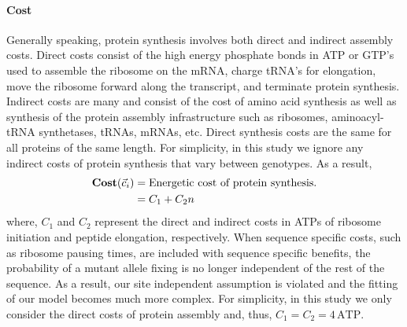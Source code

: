 \documentclass{article}
\newcommand{\cvec}{\ensuremath{\Vec{c}}\xspace}
\newcommand{\cveci}{\ensuremath{\cvec_i}\xspace}
\newcommand{\Cost}{\ensuremath{\text{\textbf{Cost}}}\xspace}
\newcommand{\Costcveci}{\ensuremath{\Cost(\cveci)}\xspace}
\begin{document}
\paragraph*{Cost}
Generally speaking, protein synthesis involves both direct and indirect assembly costs.
Direct costs consist of the high energy phosphate bonds in ATP or GTP's used to assemble the ribosome on the mRNA, charge tRNA's for elongation, move the ribosome forward along the transcript, and terminate protein synthesis.
Indirect costs are many and consist of the cost of amino acid synthesis as well as synthesis of the protein assembly infrastructure such as ribosomes, aminoacyl-tRNA synthetases, tRNAs, mRNAs, etc.
Direct synthesis costs are the same for all proteins of the same length.
For simplicity, in this study we ignore any indirect costs of protein synthesis that vary between genotypes.
As a result, 
\begin{align}
\label{eq:defineCost}
  \Costcveci  &= \text{Energetic cost of protein synthesis.}\\
  &= C_1 + C_2 n
\end{align}
where, $C_1$ and $C_2$ represent the direct and indirect costs in ATPs of ribosome initiation and peptide elongation, respectively.
When sequence specific costs, such as ribosome pausing times, are included with sequence specific benefits, the probability of a mutant allele fixing is no longer independent of the rest of the sequence.
As a result, our site independent assumption is violated and the fitting of our model becomes much more complex.
For simplicity, in this study we only consider the direct costs of protein assembly and, thus, $C_1 = C_2 = 4  \,\text{ATP}$.
 
\end{document}
